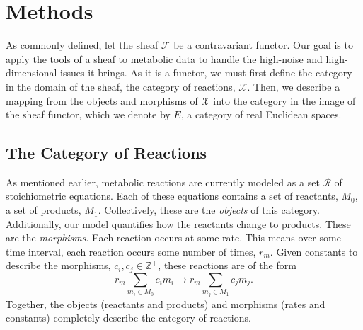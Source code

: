 \documentclass[10.5pt]{article}
\begin{document}
\section{Methods}
As commonly defined, let the sheaf $\mathscr{F}$ be a
contravariant functor. Our goal is to apply the tools of a sheaf to metabolic 
data to handle the high-noise and high-dimensional issues it brings. As it is a 
functor, we must first define the category in the domain of the sheaf, the
category of reactions, $\mathcal{X}$. Then, we describe a mapping from the
objects and morphisms of $\mathcal{X}$ into the category in the image of the
sheaf functor, which we denote by $E$, a category of real Euclidean spaces. 

\subsection{The Category of Reactions}
As mentioned earlier, metabolic reactions are currently modeled as a set 
$\mathcal{R}$ of stoichiometric equations. Each of these equations contains a 
set of reactants, $M_0$, a set of products, $M_1$. Collectively, these are the 
\textit{objects} of this category. Additionally, our model quantifies how the 
reactants change to products. These are the \textit{morphisms}. Each reaction 
occurs at some rate. This means over some time interval, each reaction occurs 
some number of times, $r_m$. Given constants to describe the morphisms, 
$c_i,c_j \in \mathbb{Z}^+$, these reactions are of the form \begin{equation}
r_m\sum_{m_i \in M_0} c_i m_i \rightarrow r_m\sum_{m_j \in M_1} c_j m_j .
\end{equation}  
Together, the objects (reactants and products) and morphisms (rates and constants) completely describe the category of reactions.
\end{document}
